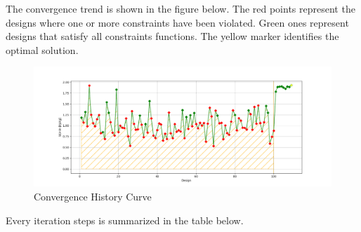 \documentclass[paper=a4, parskip, fontsize=11pt]{scrartcl}
\begin{document}
	The convergence trend is shown in the figure below. The red points represent the designs where one or more constraints have been violated. Green ones represent designs that satisfy all constraints functions. The yellow marker identifies the optimal solution. 

    
    \begin{figure}[hbt!]
	\includegraphics[width=1.0\linewidth]{convergence_Opti5.png}
	\caption{Convergence History Curve}
	\label{fig:convergence}
	\end{figure}
    
    Every iteration steps is summarized in the table below.
    
\end{document}
